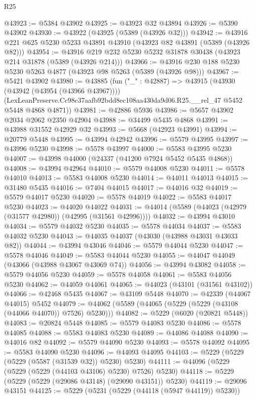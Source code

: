 \begin{lexlean}{R25}
\begin{coremodule}
@43923 := @5384 @43902
@43925 := @43923 @32 @43894
@43926 := @5390 @43902
@43930 := @43922 (@43925 (@5389 (@43926 @32)))
@43942 := @43916 @221 @625 @5230 @5233 @43891 @43910 (@43923 @82 @43891 (@5389 (@43926 @82)))
@43954 := @43916 @219 @232 @5230 @5232 @31878 @30438 (@43923 @214 @31878 (@5389 (@43926 @214)))
@43966 := @43916 @230 @188 @5230 @5230 @5263 @4877 (@43923 @98 @5263 (@5389 (@43926 @98)))
@43967 := @5421 @43902
@43980 := @43885
    (fun ("_" : @42887) =>
    @43915
      (@43930 (@43942 (@43954 (@43966 @43967))))
      (LexLeanPreserve.Cc98c37aafb92bdd8ec108aa430da9d06.R25.__rel_47 @5452 @5448 @4868 @4871))
@43981 := @42886 @5936
@43986 := @5657 @43902 @2034 @2062 @2350 @42904
@43988 := @34499 @5435 @4868
@43991 := @43988 @31552 @42929 @32
@43993 := @5668 (@42923 @43991)
@43994 := @20779 @5448
@43995 := @43994 @42942
@43996 := @5579 @43995
@43997 := @43996 @5230
@43998 := @5578 @43997
@44000 := @5583 @43995 @5230
@44007 := @43998 @44000 (@24337 (@41200 @7924 @5452 @5435 @4868))
@44008 := @43994 @42964
@44010 := @5579 @44008 @5230
@44011 := @5578 @44010
@44013 := @5583 @44008 @5230
@44014 := @44011 @44013
@44015 := @31480 @5435
@44016 := @7404 @44015
@44017 := @44016 @32
@44019 := @5579 @44017 @5230
@44020 := @5578 @44019
@44022 := @5583 @44017 @5230
@44023 := @44020 @44022
@44031 := @44014 (@5589 (@44023 (@42979 (@31577 @42980)) (@42995 (@31561 @42996))))
@44032 := @43994 @43010
@44034 := @5579 @44032 @5230
@44035 := @5578 @44034
@44037 := @5583 @44032 @5230
@44043 := @44035 @44037 (@43030 (@43988 @43031 @43033 @82))
@44044 := @43994 @43046
@44046 := @5579 @44044 @5230
@44047 := @5578 @44046
@44049 := @5583 @44044 @5230
@44055 := @44047 @44049 (@43066 (@43988 @43067 @43069 @74))
@44056 := @43994 @43082
@44058 := @5579 @44056 @5230
@44059 := @5578 @44058
@44061 := @5583 @44056 @5230
@44062 := @44059 @44061
@44065 := @44023 (@43101 (@31561 @43102))
@44066 := @42468 @5435
@44067 := @43109 @5448
@44070 := @42339 (@44067 @44015) @5452
@44079 := @44062 (@5589 (@44065 (@5229 (@5229 (@43108 (@44066 @44070)) @7526) @5230)))
@44082 := @5229 (@6020 (@20821 @5448))
@44083 := @20824 @5448
@44085 := @5579 @44083 @5230
@44086 := @5578 @44085
@44088 := @5583 @44083 @5230
@44089 := @44086 @44088
@44090 := @44016 @82
@44092 := @5579 @44090 @5230
@44093 := @5578 @44092
@44095 := @5583 @44090 @5230
@44096 := @44093 @44095
@44103 := @5229 (@5229 (@5229 (@5587 (@31539 @32)) @5230) @5230)
@44111 := @44096 (@5229 (@5229 (@5229 (@44103 @43106) @5230) @7526) @5230)
@44118 := @5229 (@5229 (@5229 (@29086 @43148) (@29090 @43151)) @5230)
@44119 := @29096 @43151
@44125 := @5229 (@5231 (@5229 (@44118 (@5947 @44119)) @5230))

\end{coremodule}
\end{lexlean}
